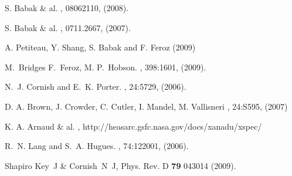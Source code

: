 \documentclass{iopart}
\begin{document}
\begin{thebibliography}{99}

S. Babak \& al.
, 08062110, (2008).

S. Babak \& al.
, 0711.2667, (2007).


A. Petiteau, Y. Shang, S. Babak and  F. Feroz
 (2009)

M.~Bridges F.~Feroz, M. P.~Hobson.
, 398:1601, (2009).


N.~J. Cornish and E.~K. Porter.
, 24:5729, (2006).

D. A. Brown, J. Crowder, C. Cutler, I. Mandel, M. Vallisneri
, 24:{S595}, (2007)  

K. A. Arnaud \& al.
, http://heasarc.gsfc.nasa.gov/docs/xanadu/xspec/ 


R.~N. Lang and S.~A. Hugues.
, 74:122001, (2006).

 Shapiro Key~J \& Cornish~N~J, Phys. Rev. D {\bf 79} 043014 (2009).

\end{thebibliography}
\end{document}
